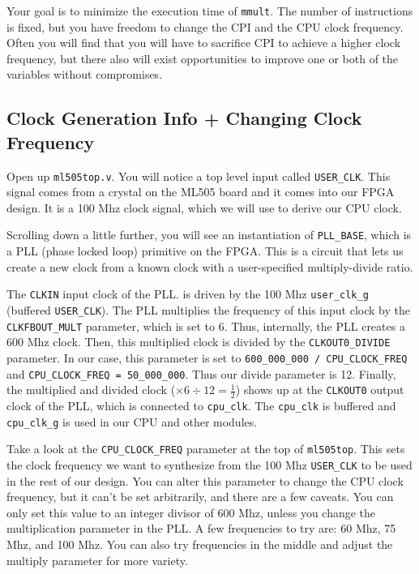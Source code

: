 \documentclass[11pt]{article}
\begin{document}
Your goal is to minimize the execution time of \verb|mmult|. The number of instructions is fixed, but you have freedom to change the CPI and the CPU clock frequency. Often you will find that you will have to sacrifice CPI to achieve a higher clock frequency, but there also will exist opportunities to improve one or both of the variables without compromises.

\subsection{Clock Generation Info + Changing Clock Frequency}
Open up \verb|ml505top.v|. You will notice a top level input called \verb|USER_CLK|. This signal comes from a crystal on the ML505 board and it comes into our FPGA design. It is a 100 Mhz clock signal, which we will use to derive our CPU clock.

Scrolling down a little further, you will see an instantiation of \verb|PLL_BASE|, which is a PLL (phase locked loop) primitive on the FPGA. This is a circuit that lets us create a new clock from a known clock with a user-specified multiply-divide ratio. 

The \verb|CLKIN| input clock of the PLL. is driven by the 100 Mhz \verb|user_clk_g| (buffered \verb|USER_CLK|). The PLL multiplies the frequency of this input clock by the \verb|CLKFBOUT_MULT| parameter, which is set to 6. Thus, internally, the PLL creates a 600 Mhz clock. Then, this multiplied clock is divided by the \verb|CLKOUT0_DIVIDE| parameter. In our case, this parameter is set to \verb|600_000_000 / CPU_CLOCK_FREQ| and \verb|CPU_CLOCK_FREQ = 50_000_000|. Thus our divide parameter is 12. Finally, the multiplied and divided clock ($\times 6 \div 12 = \frac{1}{2}$) shows up at the \verb|CLKOUT0| output clock of the PLL, which is connected to \verb|cpu_clk|. The \verb|cpu_clk| is buffered and \verb|cpu_clk_g| is used in our CPU and other modules.

Take a look at the \verb|CPU_CLOCK_FREQ| parameter at the top of \verb|ml505top|. This sets the clock frequency we want to synthesize from the 100 Mhz \verb|USER_CLK| to be used in the rest of our design. You can alter this parameter to change the CPU clock frequency, but it can't be set arbitrarily, and there are a few caveats. You can only set this value to an integer divisor of 600 Mhz, unless you change the multiplication parameter in the PLL. A few frequencies to try are: 60 Mhz, 75 Mhz, and 100 Mhz. You can also try frequencies in the middle and adjust the multiply parameter for more variety.
\end{document}
